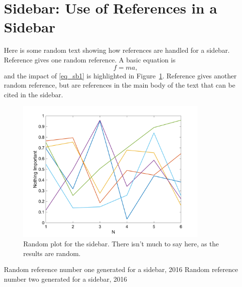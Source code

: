 \documentclass[letterpaper,12pt,peerreviewca,draftcls]{IEEEtran}
\newcommand{\be}{\begin{equation}}\newcommand{\ee}{\end{equation}}
\begin{document}
\processdelayedfloats %

\sidebars %

\clearpage
\newpage

\section[Use of References in a Sidebar]{Sidebar: Use of References in a Sidebar}
\label{sb:UseofRefs}
Here is some random text showing how references are handled for a sidebar. 
Reference \cite{S1} gives one random reference. A basic equation is
\be f=ma, \label{eq_sb1}
\ee
and the impact of \eqref{eq_sb1} is highlighted in Figure~\ref{sb_fig1}. Reference \cite{S2} gives another random reference, but \cite{LT,BIB} are references in the main body of the text that can be cited in the sidebar.

\begin{figure}[!h]
\centering
\includegraphics[width=0.85\textwidth,trim=10 10 10 10,clip]{sb_figure1}
\caption{Random plot for the sidebar. There isn't much to say here, as the results are random.\label{sb_fig1}}
\end{figure}

\begin{thebibliography}{10}
	 Random reference number one generated for a sidebar, 2016
	 Random reference number two generated for a sidebar, 2016
\end{thebibliography}

\newpage
\processdelayedfloats %
\clearpage
\end{document}
